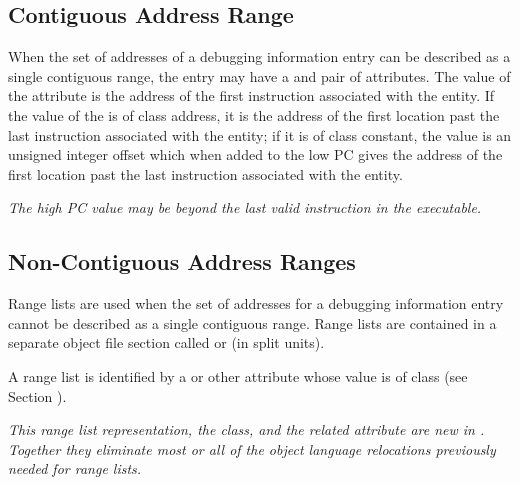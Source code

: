 \subsection{Contiguous Address Range}
\label{chap:contiguousaddressranges}
When the set of addresses of a debugging information entry can
be described as a single contiguous range, the entry may
have a \DWATlowpc{} and \DWAThighpc{} pair of attributes.
The value of the \DWATlowpc{} attribute is the address of the
first instruction associated with the entity. If the value of
the \DWAThighpc{} is of class address, it is the
address of the first location past the last instruction
associated with the entity; if it is of class constant, the
value is an unsigned integer offset which when added to the
low PC gives the address of the first location past the last
instruction associated with the entity.

\textit{The high PC value
may be beyond the last valid instruction in the executable.}

\subsection{Non-Contiguous Address Ranges}
\label{chap:noncontiguousaddressranges}
Range lists are used when the set of addresses for a debugging
information entry cannot be described as a single contiguous
range.
Range lists are contained in a separate object file section
called \dotdebugrnglists{} or \dotdebugrnglistsdwo{} (in split units).

A range list is identified by a \DWATranges{}
or other attribute whose value is of class \CLASSrnglist{}
(see Section ).

\textit{This range list representation, the \CLASSrnglist{} class, and the
related \DWATrnglistsbase{} attribute are new in \DWARFVersionV.
Together they eliminate most or all of the object language relocations
previously needed for range lists.}

